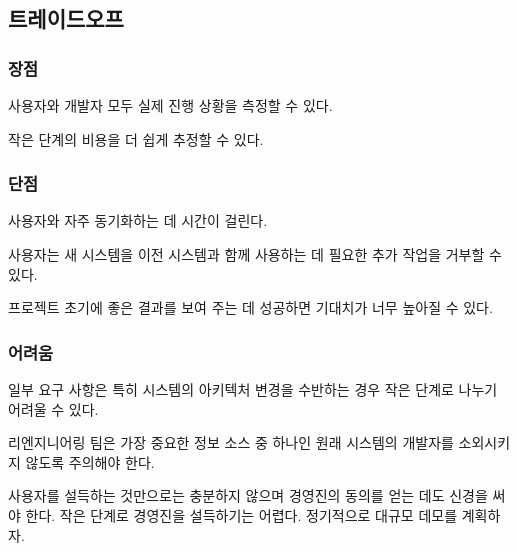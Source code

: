 \documentclass[a4paper,10pt,twoside]{book}
\begin{document}
\subsection*{트레이드오프}

\subsubsection*{장점}

\begin{bulletlist}
\item 사용자와 개발자 모두 실제 진행 상황을 측정할 수 있다.

\item 작은 단계의 비용을 더 쉽게 추정할 수 있다.
\end{bulletlist}

\subsubsection*{단점}

\begin{bulletlist}
\item 사용자와 자주 동기화하는 데 시간이 걸린다.

\item 사용자는 새 시스템을 이전 시스템과 함께 사용하는 데 필요한 추가 작업을 거부할 수 있다.

\item 프로젝트 초기에 좋은 결과를 보여 주는 데 성공하면 기대치가 너무 높아질 수 있다.
\end{bulletlist}

\subsubsection*{어려움}

\begin{bulletlist}
\item 일부 요구 사항은 특히 시스템의 아키텍처 변경을 수반하는 경우 작은 단계로 나누기 어려울 수 있다.

\item 리엔지니어링 팀은 가장 중요한 정보 소스 중 하나인 원래 시스템의 개발자를 소외시키지 않도록 주의해야 한다.

\item 사용자를 설득하는 것만으로는 충분하지 않으며 경영진의 동의를 얻는 데도 신경을 써야 한다. 작은 단계로 경영진을 설득하기는 어렵다. 정기적으로 대규모 데모를 계획하자.
\end{bulletlist}
\end{document}
